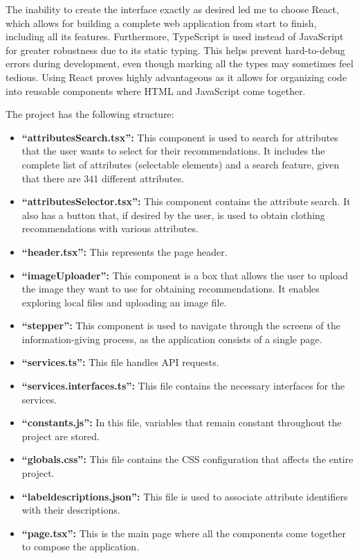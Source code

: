 \documentclass[12pt]{report} %
\begin{document}
The inability to create the interface exactly as desired led me to choose React, which allows for building a complete web application from start to finish, including all its features. Furthermore, TypeScript is used instead of JavaScript for greater robustness due to its static typing. This helps prevent hard-to-debug errors during development, even though marking all the types may sometimes feel tedious. Using React proves highly advantageous as it allows for organizing code into reusable components where HTML and JavaScript come together.

The project has the following structure:

\begin{itemize}
	\item \textbf{``attributesSearch.tsx'':} This component is used to search for attributes that the user wants to select for their recommendations. It includes the complete list of attributes (selectable elements) and a search feature, given that there are 341 different attributes.
	\item \textbf{``attributesSelector.tsx'':} This component contains the attribute search. It also has a button that, if desired by the user, is used to obtain clothing recommendations with various attributes.
	\item \textbf{``header.tsx'':} This represents the page header.
	\item \textbf{``imageUploader'':} This component is a box that allows the user to upload the image they want to use for obtaining recommendations. It enables exploring local files and uploading an image file.
	\item \textbf{``stepper'':} This component is used to navigate through the screens of the information-giving process, as the application consists of a single page.
	\item \textbf{``services.ts'':} This file handles API requests.
	\item \textbf{``services.interfaces.ts'':} This file contains the necessary interfaces for the services.
	\item \textbf{``constants.js'':} In this file, variables that remain constant throughout the project are stored.
	\item \textbf{``globals.css'':} This file contains the CSS configuration that affects the entire project.
	\item \textbf{``label\textunderscore descriptions.json'':} This file is used to associate attribute identifiers with their descriptions.
	\item \textbf{``page.tsx'':} This is the main page where all the components come together to compose the application.
\end{itemize}
\end{document}
